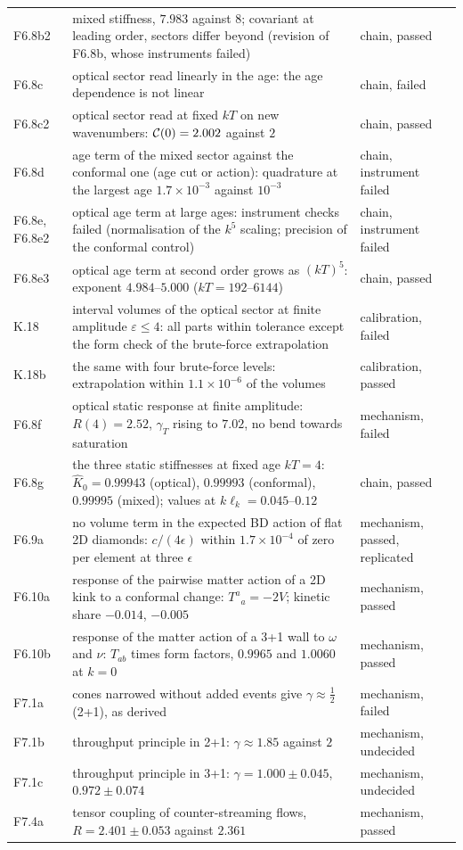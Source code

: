 {\begin{xltabular}{\linewidth}{>{\raggedright\arraybackslash}p{1.9cm}>{\raggedright\arraybackslash}X>{\raggedright\arraybackslash}p{3.0cm}}
F6.8b2 & mixed stiffness, $7.983$ against $8$; covariant at leading order, sectors differ beyond (revision of F6.8b, whose instruments failed) & chain, passed\\
F6.8c & optical sector read linearly in the age: the age dependence is not linear & chain, failed\\
F6.8c2 & optical sector read at fixed $kT$ on new wavenumbers: $\mathcal{C}(0)=2.002$ against $2$ & chain, passed\\
F6.8d & age term of the mixed sector against the conformal one (age cut or action): quadrature at the largest age $1.7\times10^{-3}$ against $10^{-3}$ & chain, instrument failed\\
F6.8e, F6.8e2 & optical age term at large ages: instrument checks failed (normalisation of the $k^5$ scaling; precision of the conformal control) & chain, instrument failed\\
F6.8e3 & optical age term at second order grows as $(kT)^5$: exponent $4.984$--$5.000$ ($kT=192$--$6144$) & chain, passed\\
K.18 & interval volumes of the optical sector at finite amplitude $\varepsilon\le4$: all parts within tolerance except the form check of the brute-force extrapolation & calibration, failed\\
K.18b & the same with four brute-force levels: extrapolation within $1.1\times10^{-6}$ of the volumes & calibration, passed\\
F6.8f & optical static response at finite amplitude: $R(4)=2.52$, $\gamma_T$ rising to $7.02$, no bend towards saturation & mechanism, failed\\
F6.8g & the three static stiffnesses at fixed age $kT=4$: $\hat K_0=0.99943$ (optical), $0.99993$ (conformal), $0.99995$ (mixed); values at $k\ell_k=0.045$--$0.12$ & chain, passed\\
F6.9a & no volume term in the expected BD action of flat 2D diamonds: $c/(4\epsilon)$ within $1.7\times10^{-4}$ of zero per element at three $\epsilon$ & mechanism, passed, replicated\\
F6.10a & response of the pairwise matter action of a 2D kink to a conformal change: $T^a{}_a=-2V$; kinetic share $-0.014$, $-0.005$ & mechanism, passed\\
F6.10b & response of the matter action of a 3+1 wall to $\omega$ and $\nu$: $T_{ab}$ times form factors, $0.9965$ and $1.0060$ at $k=0$ & mechanism, passed\\
F7.1a & cones narrowed without added events give $\gamma\approx\tfrac12$ (2+1), as derived & mechanism, failed\\
F7.1b & throughput principle in 2+1: $\gamma\approx1.85$ against $2$ & mechanism, undecided\\
F7.1c & throughput principle in 3+1: $\gamma=1.000\pm0.045$, $0.972\pm0.074$ & mechanism, undecided\\
F7.4a & tensor coupling of counter-streaming flows, $R=2.401\pm0.053$ against $2.361$ & mechanism, passed\\
\end{xltabular}}
